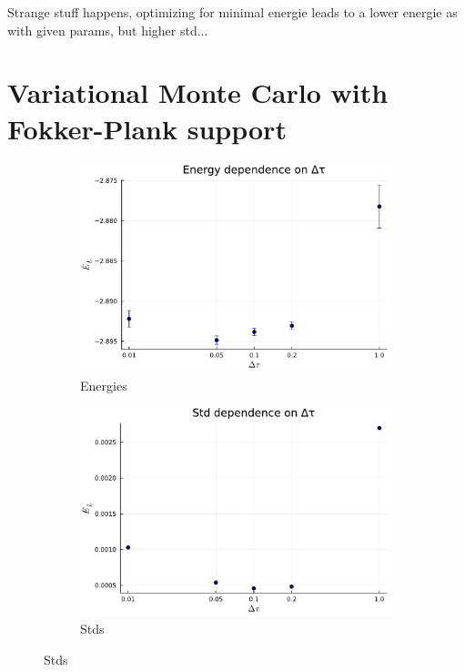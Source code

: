 \documentclass[
	a4paper, %
	10pt, %
]{CSUniSchoolLabReport}
\begin{document}
Strange stuff happens, optimizing for minimal energie leads to a lower energie as with given params, but higher std...

\section{Variational Monte Carlo with Fokker-Plank support}

\begin{figure}[H]
	\begin{subfigure}[b]{0.49\textwidth}
		\centering
		\includegraphics[width=\textwidth]{../saves/task1g.avEnergies.pdf}
		\caption{Energies}
	\end{subfigure}
	\hfill
	\begin{subfigure}[b]{0.49\textwidth}
		\centering
		\includegraphics[width=\textwidth]{../saves/task1g.avStd.pdf}
		\caption{Stds}
	\end{subfigure}
\end{figure}
\end{document}
